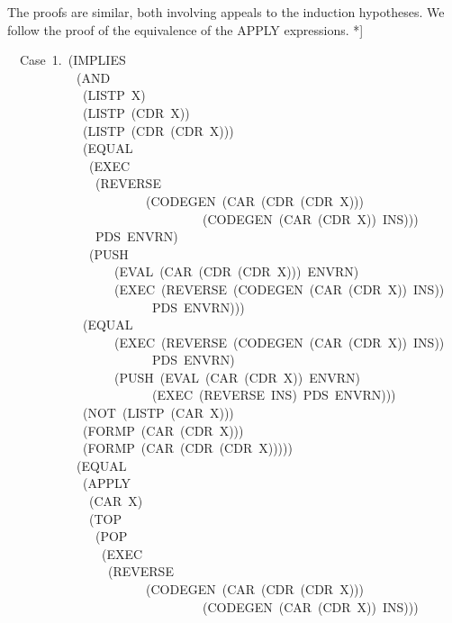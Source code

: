 \documentclass[11pt]{book}
\newenvironment{pubasis}{\begin{flushleft}\ttfamily\small}{\normalsize\rmfamily\end{flushleft}}
\begin{document}
The proofs are similar, both involving appeals to the induction hypotheses.
We  follow the proof of the equivalence of the APPLY expressions. *]
\begin{pubasis}
~~Case~1.~(IMPLIES\\
~~~~~~~~~~~(AND\\
~~~~~~~~~~~~(LISTP~X)\\
~~~~~~~~~~~~(LISTP~(CDR~X))\\
~~~~~~~~~~~~(LISTP~(CDR~(CDR~X)))\\
~~~~~~~~~~~~(EQUAL\\
~~~~~~~~~~~~~(EXEC\\
~~~~~~~~~~~~~~(REVERSE\\
~~~~~~~~~~~~~~~~~~~~~~(CODEGEN~(CAR~(CDR~(CDR~X)))\\
~~~~~~~~~~~~~~~~~~~~~~~~~~~~~~~(CODEGEN~(CAR~(CDR~X))~INS)))\\
~~~~~~~~~~~~~~PDS~ENVRN)\\
~~~~~~~~~~~~~(PUSH\\
~~~~~~~~~~~~~~~~~(EVAL~(CAR~(CDR~(CDR~X)))~ENVRN)\\
~~~~~~~~~~~~~~~~~(EXEC~(REVERSE~(CODEGEN~(CAR~(CDR~X))~INS))\\
~~~~~~~~~~~~~~~~~~~~~~~PDS~ENVRN)))\\
~~~~~~~~~~~~(EQUAL\\
~~~~~~~~~~~~~~~~~(EXEC~(REVERSE~(CODEGEN~(CAR~(CDR~X))~INS))\\
~~~~~~~~~~~~~~~~~~~~~~~PDS~ENVRN)\\
~~~~~~~~~~~~~~~~~(PUSH~(EVAL~(CAR~(CDR~X))~ENVRN)\\
~~~~~~~~~~~~~~~~~~~~~~~(EXEC~(REVERSE~INS)~PDS~ENVRN)))\\
~~~~~~~~~~~~(NOT~(LISTP~(CAR~X)))\\
~~~~~~~~~~~~(FORMP~(CAR~(CDR~X)))\\
~~~~~~~~~~~~(FORMP~(CAR~(CDR~(CDR~X)))))\\
~~~~~~~~~~~(EQUAL\\
~~~~~~~~~~~~(APPLY\\
~~~~~~~~~~~~~(CAR~X)\\
~~~~~~~~~~~~~(TOP\\
~~~~~~~~~~~~~~(POP\\
~~~~~~~~~~~~~~~(EXEC\\
~~~~~~~~~~~~~~~~(REVERSE\\
~~~~~~~~~~~~~~~~~~~~~~(CODEGEN~(CAR~(CDR~(CDR~X)))\\
~~~~~~~~~~~~~~~~~~~~~~~~~~~~~~~(CODEGEN~(CAR~(CDR~X))~INS)))\\

\end{pubasis}
\end{document}
